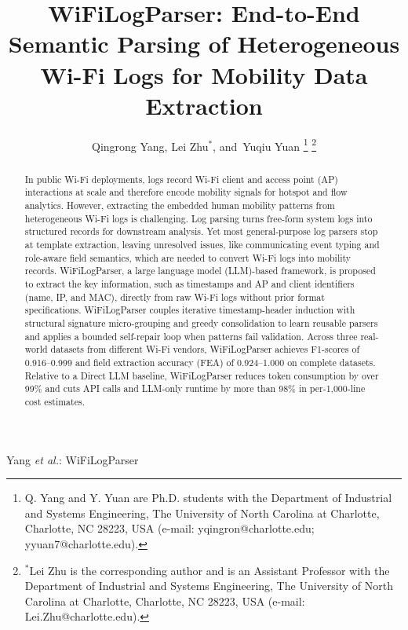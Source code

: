 \documentclass[journal]{IEEEtran}
\begin{document}
\title{WiFiLogParser: End-to-End Semantic Parsing of Heterogeneous Wi-Fi Logs for Mobility Data Extraction}

\author{Qingrong Yang,
	Lei Zhu$^{*}$,
	and~Yuqiu Yuan
	\thanks{Q. Yang and Y. Yuan are Ph.D. students with the Department of Industrial and Systems Engineering, The University of North Carolina at Charlotte, Charlotte, NC 28223, USA (e-mail: yqingron@charlotte.edu; yyuan7@charlotte.edu).}
	\thanks{$^{*}$Lei Zhu is the corresponding author and is an Assistant Professor with the Department of Industrial and Systems Engineering, The University of North Carolina at Charlotte, Charlotte, NC 28223, USA (e-mail: Lei.Zhu@charlotte.edu).}}

%
{Yang \MakeLowercase{\textit{et al.}}: WiFiLogParser}

\maketitle

\begin{abstract}
	In public Wi-Fi deployments, logs record Wi-Fi client and access point (AP) interactions at scale and therefore encode mobility signals for hotspot and flow analytics. However, extracting the embedded human mobility patterns from heterogeneous Wi-Fi logs is challenging. Log parsing turns free-form system logs into structured records for downstream analysis. Yet most general-purpose log parsers stop at template extraction, leaving unresolved issues, like communicating event typing and role-aware field semantics, which are needed to convert Wi-Fi logs into mobility records. WiFiLogParser, a large language model (LLM)-based framework, is proposed to extract the key information, such as timestamps and AP and client identifiers (name, IP, and MAC), directly from raw Wi-Fi logs without prior format specifications. WiFiLogParser couples iterative timestamp-header induction with structural signature micro-grouping and greedy consolidation to learn reusable parsers and applies a bounded self-repair loop when patterns fail validation. Across three real-world datasets from different Wi-Fi vendors, WiFiLogParser achieves F1-scores of 0.916–0.999 and field extraction accuracy (FEA) of 0.924–1.000 on complete datasets.  Relative to a Direct LLM baseline, WiFiLogParser reduces token consumption by over 99\% and cuts API calls and LLM-only runtime by more than 98\% in per-1,000-line cost estimates.
\end{abstract}
\end{document}
